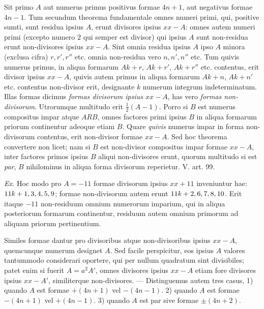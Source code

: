 Sit primo $A$ aut numerus primus positivus formae $4n+1$, aut negativus formae $4n-1$. Tum secundum theorema fundamentale omnes numeri primi, qui, positive sumti, sunt residua ipsius $A$, erunt divisores ipsius $xx-A$: omnes autem numeri primi (excepto numero $2$ qui semper est divisor) qui ipsius $A$ sunt non-residua erunt non-divisores ipsius $xx-A$. Sint omnia residua ipsius $A$ ipso $A$ minora (exclusa cifra) $r,r',r''$ etc. omnia non-residua vero $n,n',n''$ etc. Tum quivis numerus primus, in aliqua formarum $Ak+r$, $Ak+r'$, $Ak+r''$ etc. contentus, erit divisor ipsius $xx-A$, quivis autem primus in aliqua formarum $Ak+n$, $Ak+n'$ etc. contentus non-divisor erit, designante $k$ numerum integrum indeterminatum. Illas formas dicimus \textit{formas divisorum ipsius $xx-A$}, has vero \textit{formas non-divisorum}. Utrorumque multitudo erit $\frac{1}{2}(A-1)$. Porro si $B$ est numerus compositus impar atque $ARB$, omnes factores primi ipsius $B$ in aliqua formarum priorum continentur adeoque etiam $B$. Quare \textit{quivis} numerus impar in forma non-divisorum contentus, erit non-divisor formae $xx-A$. Sed hoc theorema convertere non licet; nam si $B$ est non-divisor compositus impar formae $xx-A$, inter factores primos ipsius $B$ aliqui non-divisores erunt, quorum multitudo si est \textit{par}, $B$ nihilominus in aliqua forma divisorum reperietur. V. art. 99.

\textit{Ex.} Hoc modo pro $A=-11$ formae divisorum ipsius $xx+11$ inveniuntur hae: $11k+\nobreak{}1,\allowbreak{}3,\allowbreak{}4,\allowbreak{}5,\allowbreak{}9$; formae non-divisorum autem erunt $11k+\nobreak{}2,\allowbreak{}6,\allowbreak{}7,\allowbreak{}8,\allowbreak{}10$. Erit itaque $-11$ non-residuum omnium numerorum imparium, qui in aliqua posteriorum formarum continentur, residuum autem omnium primorum ad aliquam priorum pertinentium.

Similes formae dantur pro divisoribus atque non-divisoribus ipsius $xx-A$, quemcunque numerum designet $A$. Sed facile perspicitur, eos ipsius $A$ valores tantummodo considerari oportere, qui per nullum quadratum sint divisibiles; patet enim si fuerit $A=a^2A'$, omnes divisores ipsius $xx-A$ etiam fore divisores ipsius $xx-A'$, similiterque non-divisores. --- Distinguemus autem tres casus, 1) quando $A$ est formae $+(4n+1)$ vel $-(4n-1)$. 2) quando $A$ est formae $-(4n+1)$ vel $+(4n-1)$. 3) quando $A$ est par sive formae $\pm(4n+2)$.


